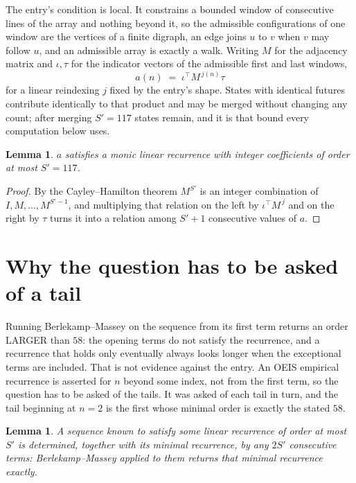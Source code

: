 \documentclass[11pt,a4paper]{article}
\theoremstyle{plain}
\newtheorem{lemma}[theorem]{Lemma}
\theoremstyle{definition}
\begin{document}
The entry's condition is local. It constrains a bounded window of consecutive lines of the
array and nothing beyond it, so the admissible configurations of one window are the vertices of
a finite digraph, an edge joins $u$ to $v$ when $v$ may follow $u$, and an admissible array is
exactly a walk. Writing $M$ for the adjacency matrix and $\iota,\tau$ for the indicator vectors
of the admissible first and last windows,
\[
a(n)\;=\;\iota^{\!\top}M^{\,j(n)}\tau
\]
for a linear reindexing $j$ fixed by the entry's shape. States with identical futures
contribute identically to that product and may be merged without changing any count; after
merging $S'=117$ states remain, and it is that bound every computation below uses.

\begin{lemma}\label{lem:cf}
$a$ satisfies a monic linear recurrence with integer coefficients of order at most $S'=117$.
\end{lemma}

\begin{proof}
By the Cayley--Hamilton theorem $M^{S'}$ is an integer combination of $I,M,\dots,M^{S'-1}$,
and multiplying that relation on the left by $\iota^{\!\top}M^{\,j}$ and on the right by
$\tau$ turns it into a relation among $S'+1$ consecutive values of $a$.
\end{proof}

\section{Why the question has to be asked of a tail}

Running Berlekamp--Massey on the sequence from its first term returns an order LARGER than $58$: the opening terms do not satisfy the recurrence, and a recurrence that holds only eventually always looks longer when the exceptional terms are included. That is not evidence against the entry. An OEIS empirical recurrence is asserted for $n$ beyond some index, not from the first term, so the question has to be asked of the tails. It was asked of each tail in turn, and the tail beginning at $n=2$ is the first whose minimal order is exactly the stated $58$.

\begin{lemma}\label{lem:bm}
A sequence known to satisfy some linear recurrence of order at most $S'$ is determined,
together with its minimal recurrence, by any $2S'$ consecutive terms: Berlekamp--Massey applied
to them returns that minimal recurrence exactly.
\end{lemma}
\end{document}
